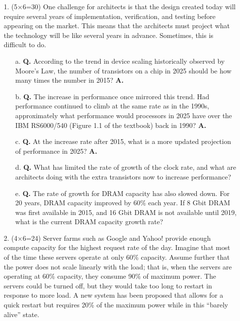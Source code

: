 \documentclass[main.tex]{subfiles}
\begin{document}
\begin{enumerate}
    \item [1.] (5×6=30) One challenge for architects is that the design created today will require several years of implementation, verification, and testing before appearing on the market. This means that the architects must project what the technology will be like several years in advance. Sometimes, this is difficult to do. 

    \begin{enumerate}
        \item [a.] \textbf{Q.} According to the trend in device scaling historically observed by Moore’s Law, the number of transistors on a chip in 2025 should be how many times the number in 2015? \textbf{A.}
        
        \item [b.] \textbf{Q.} The increase in performance once mirrored this trend. Had performance continued to climb at the same rate as in the 1990s, approximately what performance would processors in 2025 have over the IBM RS6000/540 (Figure 1.1 of the textbook) back in 1990? \textbf{A.}
        
        \item [c.] \textbf{Q.} At the increase rate after 2015, what is a more updated projection of performance in 2025? \textbf{A.}
        
        \item [d.] \textbf{Q.} What has limited the rate of growth of the clock rate, and what are architects doing with the extra transistors now to increase performance? 

        \item [e.] \textbf{Q.} The rate of growth for DRAM capacity has also slowed down. For 20 years, DRAM capacity improved by 60\% each year. If 8 Gbit DRAM was first available in 2015, and 16 Gbit DRAM is not available until 2019, what is the current DRAM capacity growth rate? 
    \end{enumerate}

    \item [2.] (4×6=24)  Server farms such as Google and Yahoo! provide enough compute capacity for the highest request rate of the day. Imagine that most of the time these servers operate at only 60\% capacity. Assume further that the power does not scale linearly with the load; that is, when the servers are operating at 60\% capacity, they consume 90\% of maximum power. The servers could be turned off, but they would take too long to restart in response to more load. A new system has been proposed that allows for a quick restart but requires 20\% of the maximum power while in this “barely alive” state. 


\end{enumerate}
\end{document}
